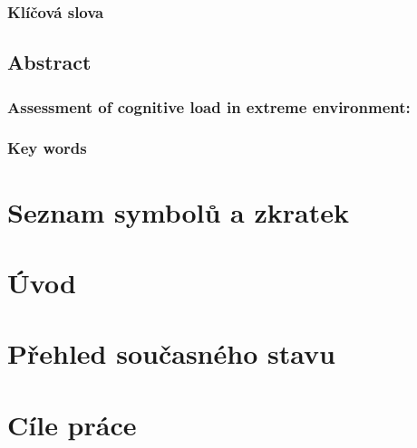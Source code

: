 \documentclass[a4paper,12pt,czech,oneside]{memoir}
\numberwithin{equation}{chapter}
\newcommand{\nazevENG}{Assessment of cognitive load in extreme environment}
\begin{document}
\subsection*{Klíčová slova}
\clearpage

\null\vfill
\section*{Abstract}
\subsection*{\nazevENG:}

\subsection*{Key words}
\clearpage

\pagestyle{plain}

\setlength\beforechapskip{-\baselineskip}
\setlength\afterchapskip{10pt}
\renewcommand{\contentsname}{\sffamily Obsah}
\tableofcontents*

\glsaddall
\clearpage

\chapter*{\sffamily Seznam symbolů a zkratek}
\printacronyms[style=long-name-desc]
\clearpage

\pagestyle{ruled}

\chapter{Úvod}

\clearpage

\chapter{Přehled současného stavu}

\clearpage

\chapter{Cíle práce}

\clearpage
\end{document}
